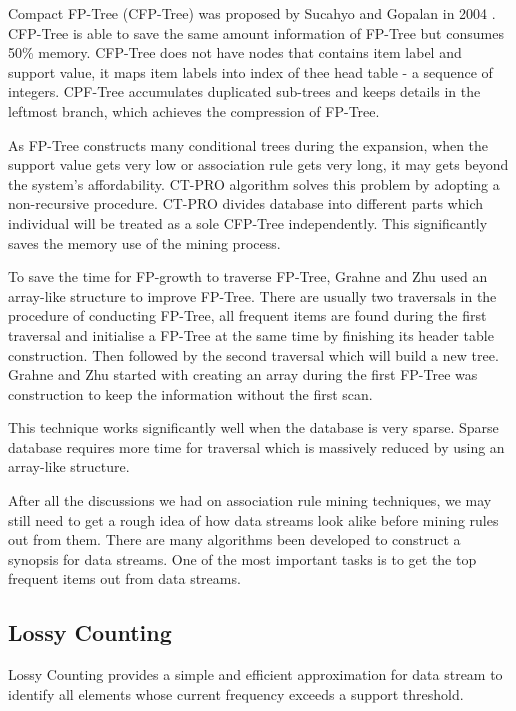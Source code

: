 \begin{definition}
\label{ctpro}
Compact FP-Tree (CFP-Tree) was proposed by Sucahyo and Gopalan in 2004 \cite{fpopt6}. CFP-Tree is able to save the same amount information of FP-Tree but consumes 50\% memory. CFP-Tree does not have nodes that contains item label and support value, it maps item labels into index of thee head table - a sequence of integers. CPF-Tree accumulates duplicated sub-trees and keeps details in the leftmost branch, which achieves the compression of FP-Tree. 
\end{definition}

As FP-Tree constructs many conditional trees during the expansion, when the support value gets very low or association rule gets very long, it may gets beyond the system's affordability. CT-PRO algorithm solves this problem by adopting a non-recursive procedure. CT-PRO divides database into different parts which individual will be treated as a sole CFP-Tree independently. This significantly saves the memory use of the mining process.

To save the time for FP-growth to traverse FP-Tree, Grahne and Zhu \cite{fpopt3} used an array-like structure to improve FP-Tree. There are usually two traversals in the procedure of conducting FP-Tree, all frequent items are found during the first traversal and initialise a FP-Tree at the same time by finishing its header table construction. Then followed by the second traversal which will build a new tree. Grahne and Zhu \cite{fpopt3} started with creating an array during the first FP-Tree was construction to keep the information without the first scan.

This technique works significantly well when the database is very sparse. Sparse database requires more time for traversal which is massively reduced by using an array-like structure.

After all the discussions we had on association rule mining techniques, we may still need to get a rough idea of how data streams look alike before mining rules out from them. There are many algorithms been developed to construct a synopsis for data streams. One of the most important tasks is to get the top frequent items out from data streams.  

\subsection{Lossy Counting}

Lossy Counting \cite{lossy} provides a simple and efficient approximation for data stream to identify all elements whose current frequency exceeds a support threshold.

